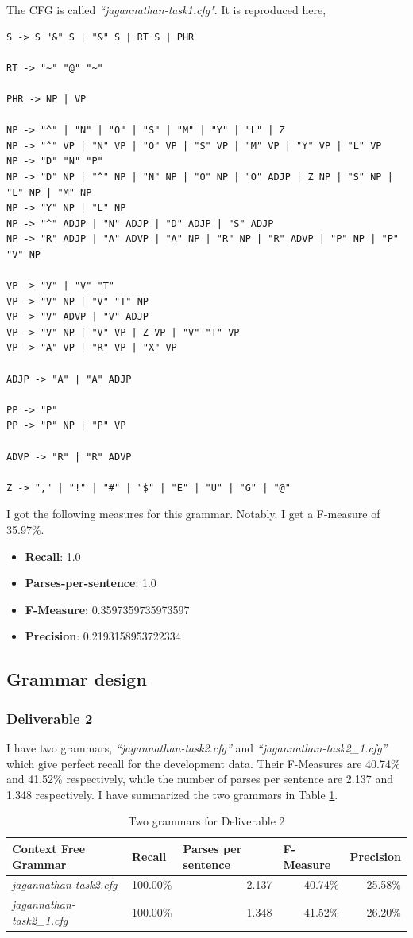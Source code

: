 \documentclass[10pt, letter]{article}
\begin{document}
The CFG is called \textit{``jagannathan-task1.cfg"}. It is reproduced here,
\begin{verbatim}
S -> S "&" S | "&" S | RT S | PHR

RT -> "~" "@" "~"

PHR -> NP | VP

NP -> "^" | "N" | "O" | "S" | "M" | "Y" | "L" | Z
NP -> "^" VP | "N" VP | "O" VP | "S" VP | "M" VP | "Y" VP | "L" VP
NP -> "D" "N" "P"
NP -> "D" NP | "^" NP | "N" NP | "O" NP | "O" ADJP | Z NP | "S" NP | "L" NP | "M" NP
NP -> "Y" NP | "L" NP
NP -> "^" ADJP | "N" ADJP | "D" ADJP | "S" ADJP
NP -> "R" ADJP | "A" ADVP | "A" NP | "R" NP | "R" ADVP | "P" NP | "P" "V" NP

VP -> "V" | "V" "T"
VP -> "V" NP | "V" "T" NP
VP -> "V" ADVP | "V" ADJP
VP -> "V" NP | "V" VP | Z VP | "V" "T" VP
VP -> "A" VP | "R" VP | "X" VP

ADJP -> "A" | "A" ADJP

PP -> "P"
PP -> "P" NP | "P" VP

ADVP -> "R" | "R" ADVP

Z -> "," | "!" | "#" | "$" | "E" | "U" | "G" | "@"
\end{verbatim}
I got the following measures for this grammar. Notably. I get a F-measure of 35.97\%.
\begin{itemize}
	\item \textbf{Recall}: 1.0
	\item \textbf{Parses-per-sentence}: 1.0
	\item \textbf{F-Measure}: 0.3597359735973597
	\item \textbf{Precision}: 0.2193158953722334
\end{itemize}

\subsection{Grammar design}
\subsubsection*{Deliverable 2}
I have two grammars, \textit{``jagannathan-task2.cfg''} and \textit{``jagannathan-task2\_1.cfg''} which give perfect recall for the development data. Their F-Measures are 40.74\% and 41.52\% respectively, while the number of parses per sentence are 2.137 and 1.348 respectively. I have summarized the two grammars in Table \ref{table1}.

\begin{table}[htbp]
\centering
\begin{tabular}{|l|r|r|r|r|}
\hline
Context Free Grammar & \multicolumn{1}{l|}{Recall} & \multicolumn{1}{l|}{Parses per sentence} & \multicolumn{1}{l|}{F-Measure} & \multicolumn{1}{l|}{Precision} \\ \hline
\textit{jagannathan-task2.cfg} & 100.00\% & 2.137 & 40.74\% & 25.58\% \\ \hline
\textit{jagannathan-task2\_1.cfg} & 100.00\% & 1.348 & 41.52\% & 26.20\% \\ \hline
\end{tabular}
\caption{Two grammars for Deliverable 2}
\label{table1}
\end{table}
\end{document}
